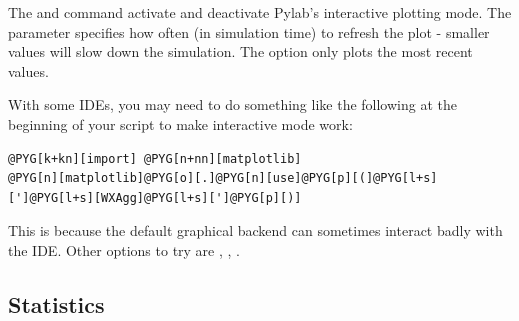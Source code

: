 \documentclass[letterpaper,10pt,english]{manual}
\begin{document}
The  and  command activate and deactivate Pylab's interactive
plotting mode. The  parameter specifies how often (in simulation
time) to refresh the plot - smaller values will slow down the simulation. The
 option only plots the most recent values.

With some IDEs, you may need to do something like the following at the
beginning of your script to make interactive mode work:

\begin{Verbatim}[commandchars=@\[\]]
@PYG[k+kn][import] @PYG[n+nn][matplotlib]
@PYG[n][matplotlib]@PYG[o][.]@PYG[n][use]@PYG[p][(]@PYG[l+s][']@PYG[l+s][WXAgg]@PYG[l+s][']@PYG[p][)]
\end{Verbatim}

This is because the default graphical backend can sometimes interact badly with
the IDE. Other options to try are , , .


\subsection{Statistics}
\end{document}
